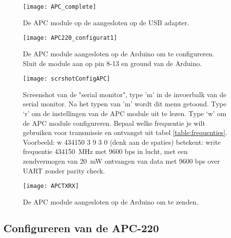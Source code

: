 \begin{figure}
    \centering
    \texttt{[image: APC\_complete]}
    \caption{De APC module op de aangesloten op de USB adapter.}
   \label{fig:APC_complete}
\end{figure}

\begin{figure}
    \centering
    \texttt{[image: APC220\_configurat1]}
    \caption{De APC module aangesloten op de Arduino om te configureren.
    Sluit de module aan op pin 8-13 en ground van de Arduino.}
   \label{fig:APC220_configurat1}
\end{figure}

\begin{figure}
    \centering
    \texttt{[image: scrshotConfigAPC]}

    \caption{Screenshot van de "serial monitor", type 'm' in de invoerbalk
    van de serial monitor. Na het typen van 'm' wordt dit menu getoond.
    Type `r' om de instellingen van de APC module uit te lezen. Type `w'
    om de APC module configureren. Bepaal welke frequentie je wilt
    gebruiken voor transmissie en ontvangst uit tabel \ref{table:frequenties}.
    Voorbeeld: w 434150 3 9 3 0 (denk aan de spaties) betekent: write
    frequentie \SI{434150}{\MHz} met 9600 bps in lucht, met een zendvermogen van
    \SI{20}{\milli\watt} ontvangen van data met 9600 bps over UART zonder parity
    check.}

   \label{fig:scrshotConfigAPC}
\end{figure}

\begin{figure}
    \centering
    \texttt{[image: APCTXRX]}
    \caption{De APC module aangesloten op de Arduino om te zenden.}
   \label{fig:APCTXRX}
\end{figure}

\subsection{Configureren van de APC-220}

